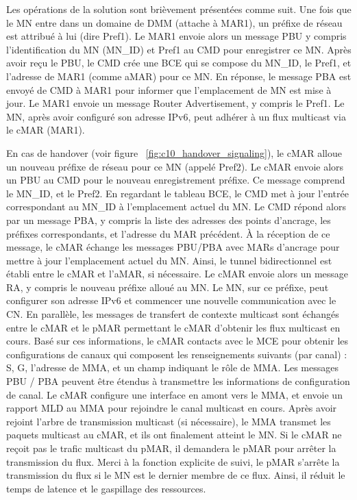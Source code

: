 Les opérations de la solution sont brièvement présentées comme suit. Une fois que le MN entre dans un domaine de DMM (attache à MAR1), un préfixe de réseau est attribué à lui (dire Pref1). Le MAR1 envoie alors un message PBU y compris l'identification du MN (MN\_ID) et Pref1 au CMD pour enregistrer ce MN. Après avoir reçu le PBU, le CMD crée une BCE qui se compose du MN\_ID, le Pref1, et l'adresse de MAR1 (comme aMAR) pour ce MN. En réponse, le message PBA est envoyé de CMD à MAR1 pour informer que l'emplacement de MN est mise à jour. Le MAR1 envoie un message Router Advertisement, y compris le Pref1. Le MN, après avoir configuré son adresse IPv6, peut adhérer à un flux multicast via le cMAR (MAR1).


En cas de handover (voir figure ~\ref{fig:c10_handover_signaling}), le cMAR alloue un nouveau préfixe de réseau pour ce MN (appelé Pref2). Le cMAR envoie alors un PBU au CMD pour le nouveau enregistrement préfixe. Ce message comprend le MN\_ID, et le Pref2. En regardant le tableau BCE, le CMD met à jour l'entrée correspondant au MN\_ID à l'emplacement actuel du MN. Le CMD répond alors par un message PBA, y compris la liste des adresses des points d'ancrage, les préfixes correspondants, et l'adresse du MAR précédent. À la réception de ce message, le cMAR échange les messages PBU/PBA avec MARs d'ancrage pour mettre à jour l'emplacement actuel du MN. Ainsi, le tunnel bidirectionnel est établi entre le cMAR et l'aMAR, si nécessaire. Le cMAR envoie alors un message RA, y compris le nouveau préfixe alloué au MN. Le MN, sur ce préfixe, peut configurer son adresse IPv6 et commencer une nouvelle communication avec le CN. En parallèle, les messages de transfert de contexte multicast sont échangés entre le cMAR et le pMAR permettant le cMAR d'obtenir les flux multicast en cours. Basé sur ces informations, le cMAR contacts avec le MCE pour obtenir les configurations de canaux qui composent les renseignements suivants (par canal) : S, G, l'adresse de MMA, et un champ indiquant le rôle de MMA. Les messages PBU / PBA peuvent être étendus à transmettre les informations de configuration de canal. Le cMAR configure une interface en amont vers le MMA, et envoie un rapport MLD au MMA pour rejoindre le canal multicast en cours. Après avoir rejoint l'arbre de transmission multicast (si nécessaire), le MMA transmet les paquets multicast au cMAR, et ils ont finalement atteint le MN. Si le cMAR ne reçoit pas le trafic multicast du pMAR, il demandera le pMAR pour arrêter la transmission du flux. Merci à la fonction explicite de suivi, le pMAR s'arrête la transmission du flux si le MN est le dernier membre de ce flux. Ainsi, il réduit le temps de latence et le gaspillage des ressources.

